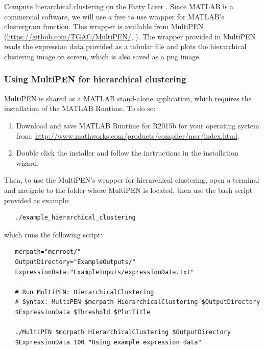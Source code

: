 \documentclass[11pt, oneside]{article}   	%
\begin{document}
Compute hierarchical clustering on the Fatty Liver \cite{Wruck2015}.
Since MATLAB is a commercial software, we will use a free to use wrapper for MATLAB's clustergram function. This wrapper is available from MultiPEN (\url{https://github.com/TGAC/MultiPEN/}, \cite{Rey2017}). The wrapper provided in MultiPEN reads the expression data provided as a tabular file and plots the hierarchical clustering image on screen, which is also saved as a png image. 

\subsubsection{Using MultiPEN for hierarchical clustering}

MultiPEN is shared as a MATLAB stand-alone application, which requires the installation of the MATLAB Runtime. To do so:

\begin{enumerate}

   \item Download and save MATLAB Runtime for R2015b for your operating system from: \url{http://www.mathworks.com/products/compiler/mcr/index.html}.

   \item Double click the installer and follow the instructions in the installation wizard.

\end{enumerate}


Then,  to use the MultiPEN's wrapper for hierarchical clustering, open a terminal and navigate to the folder where MultiPEN is located, then use the bash script provided as example: 

\begin{framed}
\begin{verbatim}
   ./example_hierarchical_clustering
\end{verbatim}
\end{framed}


\noindent which runs the following script:

\begin{framed}
\begin{verbatim}
   mcrpath="mcrroot/"
   OutputDirectory="ExampleOutputs/"
   ExpressionData="ExampleInputs/expressionData.txt"

   # Run MultiPEN: HierarchicalClustering
   # Syntax: MultiPEN $mcrpath HierarchicalClustering $OutputDirectory 
   $ExpressionData $Threshold $PlotTitle

   ./MultiPEN $mcrpath HierarchicalClustering $OutputDirectory 
   $ExpressionData 100 "Using example expression data"
   
\end{verbatim}
\end{framed}
\end{document}
